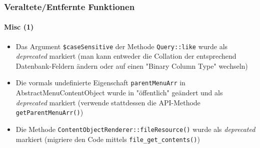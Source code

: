 \begin{frame}[fragile]
	\frametitle{Veraltete/Entfernte Funktionen}
	\framesubtitle{Misc (1)}


	\begin{itemize}

		\item Das Argument \texttt{\$caseSensitive} der Methode \texttt{Query::like}
			wurde als \textit{deprecated} markiert\newline
			\smaller
				(man kann entweder die Collation der entsprechend Datenbank-Feldern ändern oder auf einen "Binary Column Type" wechseln)
			\normalsize

		\item Die vormals  undefinierte Eigenschaft \texttt{parentMenuArr} in AbstractMenuContentObject
			wurde in "öffentlich" geändert und als \textit{deprecated} markiert\newline
			\smaller
				(verwende stattdessen die API-Methode \texttt{getParentMenuArr()})
			\normalsize

		\item Die Methode \texttt{ContentObjectRenderer::fileResource()}
			wurde als \textit{deprecated} markiert\newline
			\smaller
				(migriere den Code mittels \texttt{file\_get\_contents()})
			\normalsize

	\end{itemize}

\end{frame}





